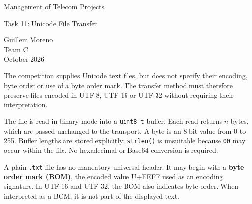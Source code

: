 \documentclass[10pt,a4paper]{article}
\newcommand{\code}[1]{\texttt{#1}}
\newcommand{\topic}[1]{\vspace{5pt}{\large\bfseries #1}\par}
\begin{document}
\vspace*{40mm}
\begin{center}
{\Large Management of Telecom Projects}\par\vspace{8pt}
{\large Task 11: Unicode File Transfer}\par\vspace{18pt}
Guillem Moreno\\[4pt]
Team C\\[12pt]
October 2026
\end{center}
\vfill
\clearpage

\topic{1. Input format and transfer method}
The competition supplies Unicode text files, but does not specify their encoding, byte order or use of a byte order mark. The transfer method must therefore preserve files encoded in UTF-8, UTF-16 or UTF-32 without requiring their interpretation.

The file is read in binary mode into a \code{uint8\_t} buffer. Each read returns $n$ bytes, which are passed unchanged to the transport. A byte is an 8-bit value from 0 to 255. Buffer lengths are stored explicitly: \code{strlen()} is unsuitable because \code{00} may occur within the file. No hexadecimal or Base64 conversion is required.

\begin{center}
\end{center}

\topic{2. Byte order mark}
A plain \code{.txt} file has no mandatory universal header. It may begin with a \textbf{byte order mark (BOM)}, the encoded value U+FEFF used as an encoding signature. In UTF-16 and UTF-32, the BOM also indicates byte order. When interpreted as a BOM, it is not part of the displayed text.
\end{document}
